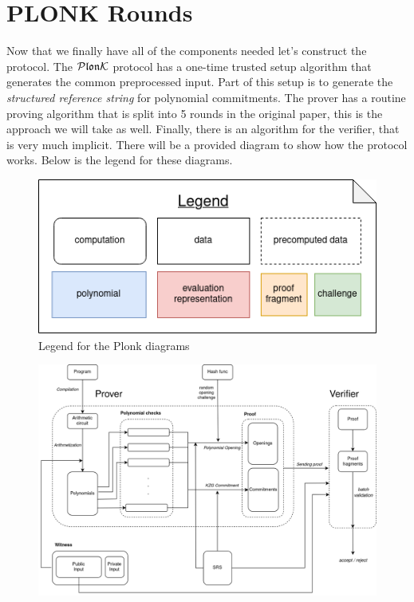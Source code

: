 \chapter{PLONK Rounds}

Now that we finally have all of the components needed let's construct the protocol. The $\mathcal{P}\mathfrak{lon}\mathcal{K}$ protocol has a one-time trusted setup algorithm that generates the common preprocessed input. Part of this setup is to generate the \textit{structured reference string} for polynomial commitments. The prover has a routine proving algorithm that is split into 5 rounds in the original paper, this is the approach we will take as well. Finally, there is an algorithm for the verifier, that is very much implicit. There will be a provided diagram to show how the protocol works. Below is the legend for these diagrams.


\begin{figure}[H]
    \centering
    \includegraphics[width=0.5\linewidth]{round-figures/legend.drawio.png}
    \caption{Legend for the Plonk diagrams}
    
\end{figure}



\begin{figure}[ht]
    \centering
    \includegraphics[width=1\linewidth]{round-figures/round1/plonk_better_overview.drawio.png}
\end{figure}


